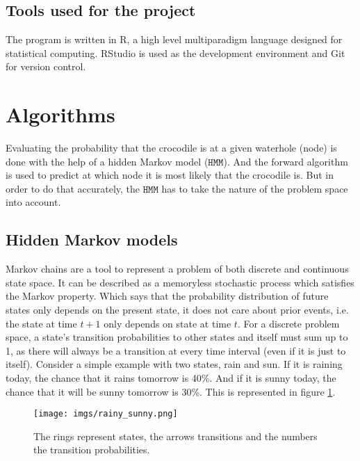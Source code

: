 \documentclass[12pt, a4paper]{article}
\newcommand{\HMM}[0]{%
  \mathtt{HMM}
}
\begin{document}
\subsection{Tools used for the project}

The program is written in R, a high level multiparadigm language designed for statistical computing. RStudio is used as the development environment and Git\cite{git} for version control. 

\section{Algorithms}

Evaluating the probability that the crocodile is at a given waterhole (node) is done with the help of a hidden Markov model ($\HMM$)\cite{hmm}. And the forward algorithm\cite{falg} is used to predict at which node it is most likely that the crocodile is. But in order to do that accurately, the $\HMM$ has to take the nature of the problem space into account.

\subsection{Hidden Markov models}

Markov chains are a tool to represent a problem of both discrete and continuous state space. It can be described as a memoryless stochastic process which satisfies the Markov property. Which says that the probability distribution of future states only depends on the present state, it does not care about prior events, i.e. the state at time $t+1$ only depends on state at time $t$. For a discrete problem space, a state's transition probabilities to other states and itself must sum up to 1, as there will always be a transition at every time interval (even if it is just to itself)\cite{hmm}\cite{MA-hmm}. Consider a simple example with two states, rain and sun. If it is raining today, the chance that it rains tomorrow is 40\%. And if it is sunny today, the chance that it will be sunny tomorrow is 30\%. This is represented in figure \ref{fig:rain-sun}.

\newpage
\begin{figure}[!ht]
\centering
\texttt{[image: imgs/rainy\_sunny.png]}\\
\caption{The rings represent states, the arrows transitions and the numbers the transition probabilities.}
\label{fig:rain-sun}
\end{figure}
\end{document}
